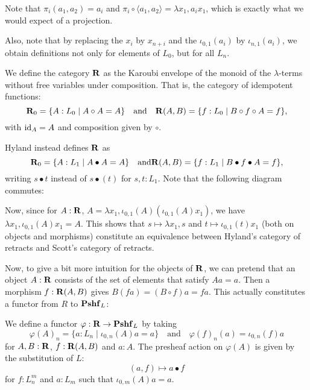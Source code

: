 Note that $ \pi_i (a_1, a_2) = a_i $ and $ \pi_i \circ \langle a_1, a_2 \rangle = \lambda x_1, a_i x_1 $, which is exactly what we would expect of a projection.

Also, note that by replacing the $ x_i $ by $ x_{n + i} $ and the $ \iota_{0, 1}(a_i) $ by $ \iota_{n, 1}(a_i) $, we obtain definitions not only for elements of $ L_0 $, but for all $ L_n $.

\begin{definition}
  We define the category $ \mathbf{R} $ as the Karoubi envelope of the monoid of the $ \lambda $-terms without free variables under composition. That is, the category of idempotent functions:
  \[ \mathbf{R}_0 = \{ A : L_0 \mid A \circ A = A \} \quad \text{and} \quad \mathbf{R}(A, B) = \{ f: L_0 \mid B \circ f \circ A = f \}, \]
  with $ \text{id}_{A} = A $ and composition given by $ \circ $.
\end{definition}

\begin{remark}
  Hyland instead defines $ \mathbf{R} $ as
  \[ \mathbf{R}_0 = \{ A : L_1 \mid A \bullet A = A \} \quad \text{and} \mathbf{R}(A, B) = \{ f : L_1 \mid B \bullet f \bullet A = f \}, \]
  writing $ s \bullet t $ instead of $ s \bullet (t) $ for $ s, t : L_1 $. Note that the following diagram commutes:
  \begin{center}
  \end{center}
  Now, since for $ A : \mathbf{R} $, $ A = \lambda x_1, \iota_{0, 1}(A) (\iota_{0, 1}(A) x_1) $, we have $ \lambda x_1, \iota_{0, 1}(A) x_1 = A $. This shows that $ s \mapsto \lambda x_1, s $ and $ t \mapsto \iota_{0, 1}(t) x_1 $ (both on objects and morphisms) constitute an equivalence between Hyland's category of retracts and Scott's category of retracts.
\end{remark}

Now, to give a bit more intuition for the objects of $ \mathbf{R} $, we can pretend that an object $ A : \mathbf{R} $ consists of the set of elements that satisfy $ A a = a $. Then a morphism $ f : \mathbf{R}(A, B) $ gives $ B (f a) = (B \circ f) a = f a $. This actually constitutes a functor from $ R $ to $ \mathbf{Pshf}_{L} $:

\begin{definition}\label{def:retracts-embedding}
  We define a functor $ \varphi: \mathbf{R} \to \mathbf{Pshf}_{L} $ by taking
  \[ \varphi(A)_n = \{ a : L_n \mid \iota_{0, n}(A) a = a \} \quad \text{and} \quad \varphi(f)_n(a) = \iota_{0, n}(f) a \]
  for $ A, B : \mathbf{R} $, $ f: \mathbf{R}(A, B) $ and $ a : A $. The presheaf action on $ \varphi(A) $ is given by the substitution of $ L $:
  \[ (a, f) \mapsto a \bullet f \]
  for $ f : L_n^m $ and $ a : L_m $ such that $ \iota_{0, m}(A) a = a $.
\end{definition}

